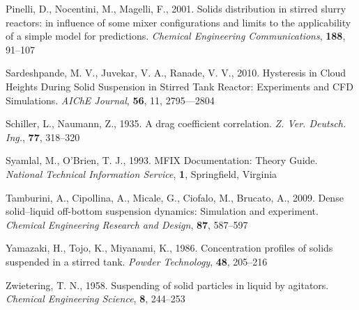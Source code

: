 \begin{thebibliography}{99}
 Pinelli, D., Nocentini, M., Magelli, F., 2001. Solids distribution in stirred slurry reactors: in influence of some mixer configurations and limits to the applicability of a simple model for predictions.
\textit{Chemical Engineering Communications}, \textbf{188}, 91--107

 Sardeshpande, M. V., Juvekar, V. A., Ranade, V. V., 2010. Hysteresis in Cloud Heights During Solid Suspension in Stirred Tank Reactor: Experiments and CFD Simulations. \textit{AIChE Journal}, \textbf{56}, 11, 2795---2804

 Schiller, L., Naumann, Z., 1935. A drag coefficient correlation. \textit{Z. Ver. Deutsch. Ing.}, \textbf{77}, 318--320

 Syamlal, M., O'Brien, T. J., 1993. MFIX Documentation: Theory Guide. \textit{National Technical Information Service}, \textbf{1}, Springfield, Virginia 

 Tamburini, A., Cipollina, A., Micale, G., Ciofalo, M., Brucato, A., 2009. Dense solid–liquid off-bottom suspension dynamics: Simulation and experiment. \textit{Chemical Engineering Research and Design}, \textbf{87}, 587--597

 Yamazaki, H., Tojo, K., Miyanami, K., 1986. Concentration profiles of solids suspended in a stirred tank. \textit{Powder Technology}, \textbf{48}, 205--216

 Zwietering, T. N., 1958. Suspending of solid particles in liquid by agitators. \textit{Chemical Engineering Science}, \textbf{8}, 244--253 

\end{thebibliography}
